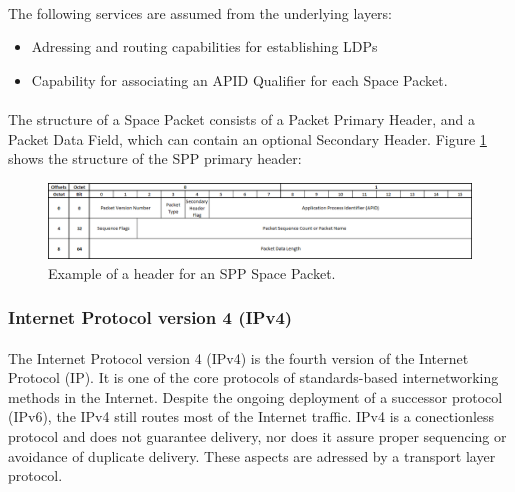 \documentclass[12pt,a4paper]{report}
\begin{document}
\paragraph{}The following services are assumed from the underlying layers:
\begin{itemize}
\item Adressing and routing capabilities for establishing LDPs
\item Capability for associating an APID Qualifier for each Space Packet.
\end{itemize}
\paragraph{}The structure of a Space Packet consists of a Packet Primary Header, and a Packet Data Field, which can contain an optional Secondary Header. Figure \ref{fig:SPPheader} shows the structure of the SPP primary header:
\begin{figure}[H]
\begin{center}
\includegraphics[scale=0.5]{SPP_header.PNG}
\caption[SPP header]{Example of a header for an SPP Space Packet.}
\label{fig:SPPheader}
\end{center}
\end{figure}

\subsubsection{Internet Protocol version 4 (IPv4)\cite{IP}}
\paragraph{}The Internet Protocol version 4 (IPv4) is the fourth version of the Internet Protocol (IP). It is one of the core protocols of standards-based internetworking methods in the Internet. Despite the ongoing deployment of a successor protocol (IPv6), the IPv4 still routes most of the Internet traffic. IPv4 is a conectionless protocol and does not guarantee delivery, nor does it assure proper sequencing or avoidance of duplicate delivery. These aspects are adressed by a transport layer protocol.
\end{document}
